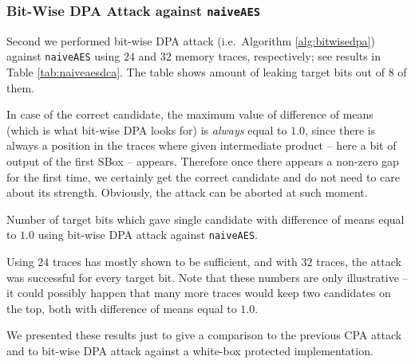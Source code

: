 \subsubsection{Bit-Wise DPA Attack against {\tt naiveAES}}
	
	Second we performed bit-wise DPA attack (i.e.\ Algorithm \ref{alg:bitwisedpa}) against {\tt naiveAES} using $24$ and $32$ memory traces, respectively; see results in Table \ref{tab:naiveaesdca}. The table shows amount of leaking target bits out of $8$ of them.
	
	\begin{note}
	\label{note:unprotect}
		In case of the correct candidate, the maximum value of difference of means (which is what bit-wise DPA looks for) is {\em always} equal to $1.0$, since there is always a position in the traces where given intermediate product -- here a bit of output of the first SBox -- appears. Therefore once there appears a non-zero gap for the first time, we certainly get the correct candidate and do not need to care about its strength. Obviously, the attack can be aborted at such moment.
	\end{note}
	
	\begin{table}[h]
		\begin{center}
		
		\end{center}
	\caption{Number of target bits which gave single candidate with difference of means equal to $1.0$ using bit-wise DPA attack against {\tt naiveAES}.}
	\label{tab:naiveaesdca}
	\end{table}
	
	Using $24$ traces has mostly shown to be sufficient, and with $32$ traces, the attack was successful for every target bit. Note that these numbers are only illustrative -- it could possibly happen that many more traces would keep two candidates on the top, both with difference of means equal to $1.0$.
	
	We presented these results just to give a comparison to the previous CPA attack and to bit-wise DPA attack against a white-box protected implementation.



